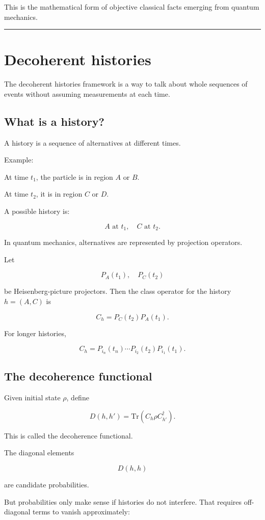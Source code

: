 \documentclass[11pt,a4paper]{article}
\begin{document}
This is the mathematical form of objective classical facts emerging from quantum mechanics.

\medskip\hrule\medskip

\section{Decoherent histories}

The decoherent histories framework is a way to talk about whole sequences of events without assuming measurements at each time.

\subsection{What is a history?}

A history is a sequence of alternatives at different times.

Example:

At time $t_1$, the particle is in region $A$ or $B$.

At time $t_2$, it is in region $C$ or $D$.

A possible history is:

\[
A \text{ at } t_1,\quad C \text{ at } t_2.
\]

In quantum mechanics, alternatives are represented by projection operators.

Let

\[
P_A(t_1),\quad P_C(t_2)
\]

be Heisenberg-picture projectors. Then the class operator for the history $h=(A,C)$ is

\[
C_h = P_C(t_2)P_A(t_1).
\]

For longer histories,

\[
C_h=P_{i_n}(t_n)\cdots P_{i_2}(t_2)P_{i_1}(t_1).
\]

\subsection{The decoherence functional}

Given initial state $\rho$, define

\[
D(h,h')=\mathrm{Tr}(C_h \rho C_{h'}^\dagger).
\]

This is called the decoherence functional.

The diagonal elements

\[
D(h,h)
\]

are candidate probabilities.

But probabilities only make sense if histories do not interfere. That requires off-diagonal terms to vanish approximately:
\end{document}
